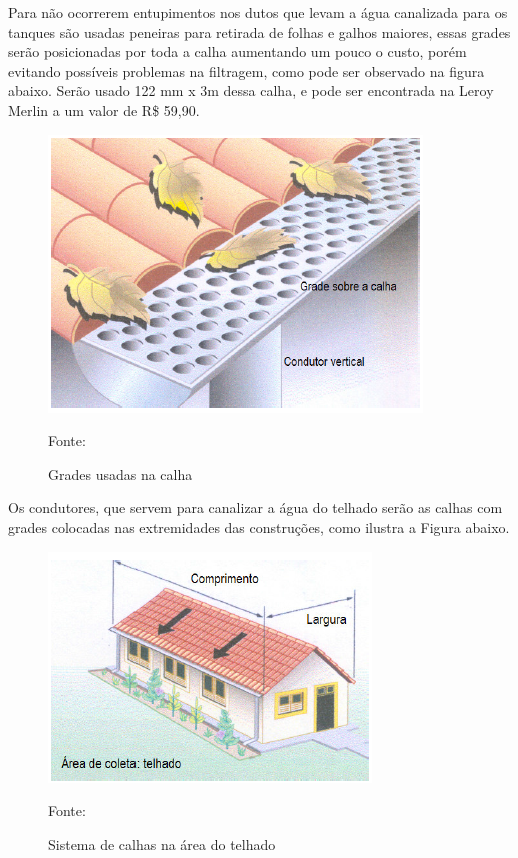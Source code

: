 	Para n\~ao ocorrerem entupimentos nos dutos que levam a \'agua canalizada para os tanques s\~ao usadas peneiras para retirada de folhas e galhos maiores, essas grades ser\~ao posicionadas por toda a calha aumentando um pouco o custo, por\'em evitando poss\'iveis problemas na filtragem, como pode ser observado na figura abaixo. Ser\~ao usado 122 mm x 3m dessa calha, e pode ser encontrada na Leroy Merlin a um valor de R\$ 59,90. 

\begin{figure}[H]
	\centering
	\label{Grades usadas na calha}
		\includegraphics[keepaspectratio=true,scale=0.9]{figuras/GradesUsadasNaCalha.png}
	\caption{Grades usadas na calha}
	\small{Fonte: \cite{WATERFALL} }
\end{figure}

Os condutores, que servem para canalizar a \'agua do telhado ser\~ao as calhas com grades colocadas nas extremidades das constru\c{c}\~oes, como ilustra a Figura abaixo.

\begin{figure}[H]
	\centering
	\label{Sistema de calhas na \'area do telhado}
		\includegraphics[keepaspectratio=true,scale=1.2]{figuras/SistemaDeCalhasNaAreaDoTelhado.png}
	\caption{Sistema de calhas na \'area do telhado}
	\small{Fonte:  \cite{WATERFALL}}
\end{figure}

